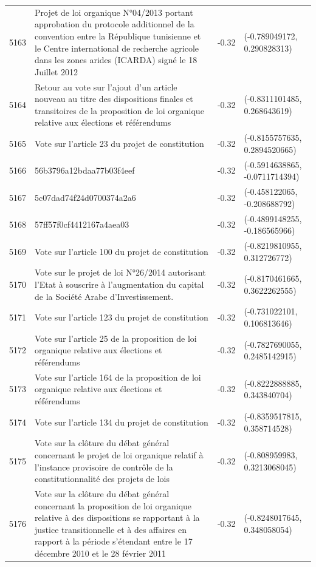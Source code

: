 \begin{table}[ht]
\begin{tabular}{rlrl}
  5163 & Projet de loi organique N°04/2013 portant approbation du protocole additionnel de la convention entre la République tunisienne et le Centre international de recherche agricole dans les zones arides (ICARDA) signé le 18 Juillet 2012 & -0.32 & (-0.789049172, 0.290828313) \\ 
  5164 & Retour au vote sur l'ajout d'un article nouveau au titre des dispositions finales et transitoires de la proposition de loi organique relative aux élections et référendums & -0.32 & (-0.8311101485, 0.268643619) \\ 
  5165 & Vote sur l'article 23 du projet de constitution & -0.32 & (-0.8155757635, 0.2894520665) \\ 
  5166 & 56b3796a12bdaa77b03f4eef & -0.32 & (-0.5914638865, -0.0711714394) \\ 
  5167 & 5c07dad74f24d0700374a2a6 & -0.32 & (-0.458122065, -0.208688792) \\ 
  5168 & 57ff57f0cf4412167a4aea03 & -0.32 & (-0.4899148255, -0.186565966) \\ 
  5169 & Vote sur l'article 100 du projet de constitution & -0.32 & (-0.8219810955, 0.312726772) \\ 
  5170 & Vote sur le projet de loi N°26/2014 autorisant l'Etat à souscrire à l'augmentation du capital de la Société Arabe d'Investissement. & -0.32 & (-0.8170461665, 0.3622262555) \\ 
  5171 & Vote sur l'article 123 du projet de constitution & -0.32 & (-0.731022101, 0.106813646) \\ 
  5172 & Vote sur l'article 25 de la proposition de loi organique relative aux élections et référendums & -0.32 & (-0.7827690055, 0.2485142915) \\ 
  5173 & Vote sur l'article 164 de la proposition de loi organique relative aux élections et référendums & -0.32 & (-0.8222888885, 0.343840704) \\ 
  5174 & Vote sur l'article 134 du projet de constitution & -0.32 & (-0.8359517815, 0.358714528) \\ 
  5175 & Vote sur la clôture du débat général concernant le projet de loi organique relatif à l'instance provisoire de contrôle de la constitutionnalité des projets de lois & -0.32 & (-0.808959983, 0.3213068045) \\ 
  5176 & Vote sur la clôture du débat général concernant la proposition de loi organique relative à des dispositions se rapportant à la justice transitionnelle et à des affaires en rapport à la période s'étendant entre le 17 décembre 2010 et le 28 février 2011 & -0.32 & (-0.8248017645, 0.348058054) \\ 

\end{tabular}
\end{table}
